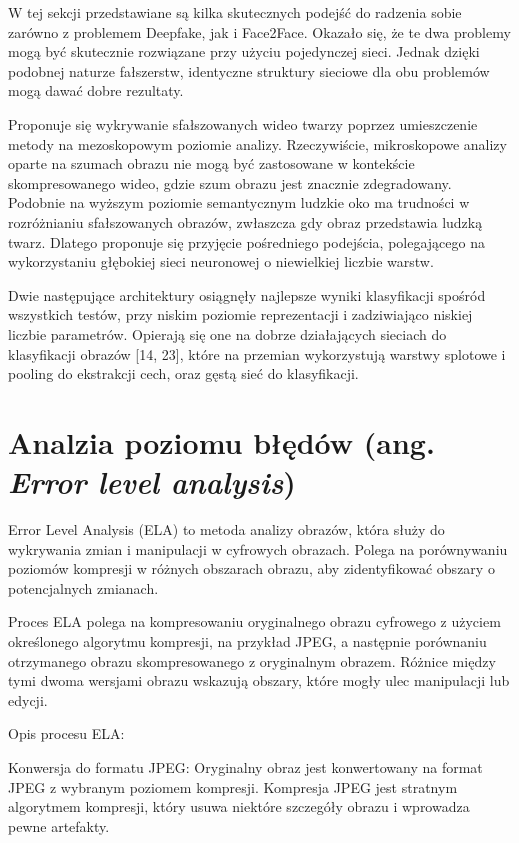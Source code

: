 W tej sekcji przedstawiane są kilka skutecznych podejść do radzenia sobie zarówno z problemem Deepfake, jak i Face2Face.
Okazało się, że te dwa problemy mogą być skutecznie rozwiązane przy użyciu pojedynczej sieci.
Jednak dzięki podobnej naturze fałszerstw, identyczne struktury sieciowe dla obu problemów mogą dawać dobre rezultaty.

Proponuje się wykrywanie sfałszowanych wideo twarzy poprzez umieszczenie metody na mezoskopowym poziomie analizy.
Rzeczywiście, mikroskopowe analizy oparte na szumach obrazu nie mogą być zastosowane w kontekście skompresowanego wideo, gdzie szum obrazu jest znacznie zdegradowany.
Podobnie na wyższym poziomie semantycznym ludzkie oko ma trudności w rozróżnianiu sfałszowanych obrazów, zwłaszcza gdy obraz przedstawia ludzką twarz.
Dlatego proponuje się przyjęcie pośredniego podejścia, polegającego na wykorzystaniu głębokiej sieci neuronowej o niewielkiej liczbie warstw.

Dwie następujące architektury osiągnęły najlepsze wyniki klasyfikacji spośród wszystkich testów, przy niskim poziomie reprezentacji i zadziwiająco niskiej liczbie parametrów.
Opierają się one na dobrze działających sieciach do klasyfikacji obrazów [14, 23], które na przemian wykorzystują warstwy splotowe i pooling do ekstrakcji cech, oraz gęstą sieć do klasyfikacji.


\section{Analzia poziomu błędów (ang. \textit{Error level analysis})}

Error Level Analysis (ELA) to metoda analizy obrazów, która służy do wykrywania zmian i manipulacji w cyfrowych obrazach.
Polega na porównywaniu poziomów kompresji w różnych obszarach obrazu, aby zidentyfikować obszary o potencjalnych zmianach.

Proces ELA polega na kompresowaniu oryginalnego obrazu cyfrowego z użyciem określonego algorytmu kompresji, na przykład JPEG, a następnie porównaniu otrzymanego obrazu skompresowanego z oryginalnym obrazem.
Różnice między tymi dwoma wersjami obrazu wskazują obszary, które mogły ulec manipulacji lub edycji.

Opis procesu ELA:

Konwersja do formatu JPEG: Oryginalny obraz jest konwertowany na format JPEG z wybranym poziomem kompresji.
Kompresja JPEG jest stratnym algorytmem kompresji, który usuwa niektóre szczegóły obrazu i wprowadza pewne artefakty.

